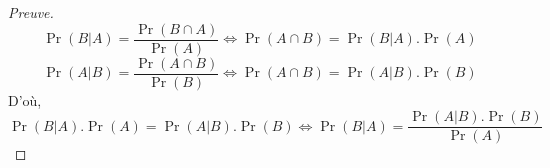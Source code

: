 

\begin{proof}[Preuve]
$$
\Pr(B|A)=\frac{\Pr(B\cap A)}{\Pr(A)}
\iff
\Pr(A\cap B) = \Pr(B|A) . \Pr(A)
$$
$$
\Pr(A|B)=\frac{\Pr(A\cap B)}{\Pr(B)}
\iff
\Pr(A\cap B) = \Pr(A|B) . \Pr(B)
$$
D'où, 
$$
\Pr(B|A).\Pr(A) = \Pr(A|B) . \Pr(B)
\iff
\Pr(B|A) = \frac{\Pr(A|B) . \Pr(B)} {\Pr(A)}
$$
\end{proof}